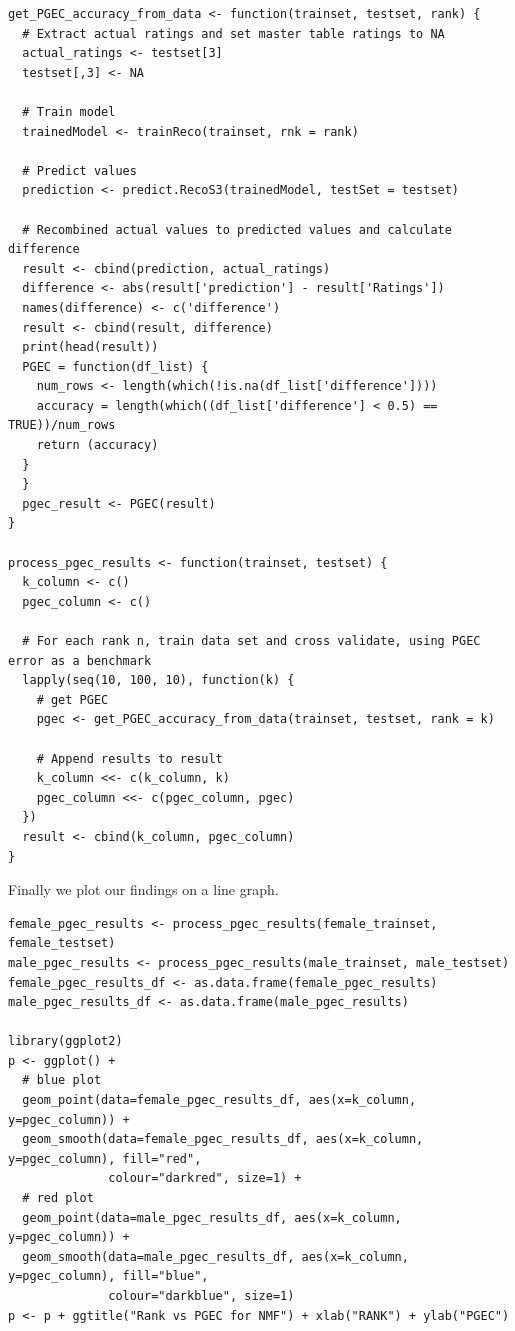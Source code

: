 \documentclass{article}
\begin{document}
\begin{verbatim}
get_PGEC_accuracy_from_data <- function(trainset, testset, rank) {
  # Extract actual ratings and set master table ratings to NA
  actual_ratings <- testset[3]
  testset[,3] <- NA
  
  # Train model
  trainedModel <- trainReco(trainset, rnk = rank)
  
  # Predict values
  prediction <- predict.RecoS3(trainedModel, testSet = testset)
  
  # Recombined actual values to predicted values and calculate difference
  result <- cbind(prediction, actual_ratings)
  difference <- abs(result['prediction'] - result['Ratings'])
  names(difference) <- c('difference')
  result <- cbind(result, difference)
  print(head(result))
  PGEC = function(df_list) {
    num_rows <- length(which(!is.na(df_list['difference'])))
    accuracy = length(which((df_list['difference'] < 0.5) == TRUE))/num_rows
    return (accuracy)
  }
  }
  pgec_result <- PGEC(result)
}

process_pgec_results <- function(trainset, testset) {
  k_column <- c()
  pgec_column <- c()
  
  # For each rank n, train data set and cross validate, using PGEC error as a benchmark
  lapply(seq(10, 100, 10), function(k) {
    # get PGEC
    pgec <- get_PGEC_accuracy_from_data(trainset, testset, rank = k)
    
    # Append results to result
    k_column <<- c(k_column, k)
    pgec_column <<- c(pgec_column, pgec)
  })
  result <- cbind(k_column, pgec_column)
}
\end{verbatim}

Finally we plot our findings on a line graph.

\begin{verbatim}
female_pgec_results <- process_pgec_results(female_trainset, female_testset)
male_pgec_results <- process_pgec_results(male_trainset, male_testset)
female_pgec_results_df <- as.data.frame(female_pgec_results)
male_pgec_results_df <- as.data.frame(male_pgec_results)

library(ggplot2)
p <- ggplot() +
  # blue plot
  geom_point(data=female_pgec_results_df, aes(x=k_column, y=pgec_column)) + 
  geom_smooth(data=female_pgec_results_df, aes(x=k_column, y=pgec_column), fill="red",
              colour="darkred", size=1) +
  # red plot
  geom_point(data=male_pgec_results_df, aes(x=k_column, y=pgec_column)) + 
  geom_smooth(data=male_pgec_results_df, aes(x=k_column, y=pgec_column), fill="blue",
              colour="darkblue", size=1)
p <- p + ggtitle("Rank vs PGEC for NMF") + xlab("RANK") + ylab("PGEC")
\end{verbatim}
\end{document}
